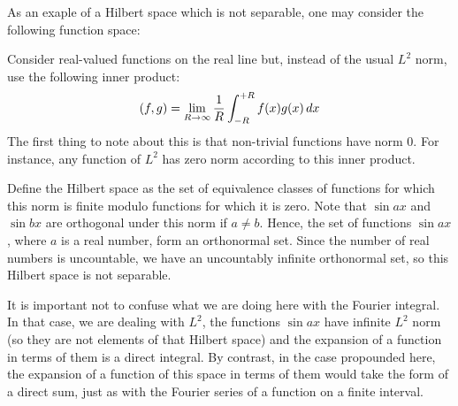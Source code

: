 \documentclass[12pt]{article}
\begin{document}
As an exaple of a Hilbert space which is not separable, one may
consider the following function space:

Consider real-valued functions on the real line but, instead of the
usual $L^2$ norm, use the following inner product:
 \[ (f,g) = \lim_{R \to \infty} {1 \over R} \int_{-R}^{+R} f(x) g(x)
 \, dx \]
The first thing to note about this is that non-trivial functions have
norm 0.  For instance, any function of $L^2$ has zero norm according
to this inner product.

Define the Hilbert space as the set of equivalence classes of
functions for which this norm is finite modulo functions for which it
is zero.  Note that $\sin ax$ and $\sin bx$ are orthogonal under this
norm if $a \neq b$.  Hence, the set of functions $\sin ax$, where $a$
is a real number, form an orthonormal set.  Since the number of real
numbers is uncountable, we have an uncountably infinite orthonormal set, 
so this Hilbert space is not separable.

It is important not to confuse what we are doing here with the Fourier
integral.  In that case, we are dealing with $L^2$, the functions
$\sin ax$ have infinite $L^2$ norm (so they are not elements of that
Hilbert space) and the expansion of a function in terms of them is a
direct integral.  By contrast, in the case propounded here, the
expansion of a function of this space in terms of them would take the
form of a direct sum, just as with the Fourier series of a function on
a finite interval.
\end{document}

